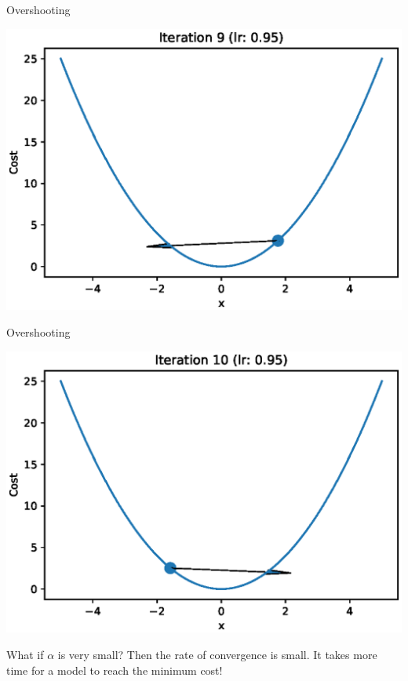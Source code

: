\documentclass{beamer}
\begin{document}
	\begin{frame}{Overshooting}
		\begin{center}
			\includegraphics[totalheight=6cm]{gradient-descent/overshooting-9.eps}
		\end{center}
	\end{frame}
	
	\begin{frame}{Overshooting}
		\begin{center}
			\includegraphics[totalheight=6cm]{gradient-descent/overshooting-10.eps}
		\end{center}
	\end{frame}
	
	\begin{frame}{What if $\alpha$ is very small?}
		Then the rate of convergence is small. It takes more time for a model to reach the minimum cost!
	\end{frame}
	
\end{document}
